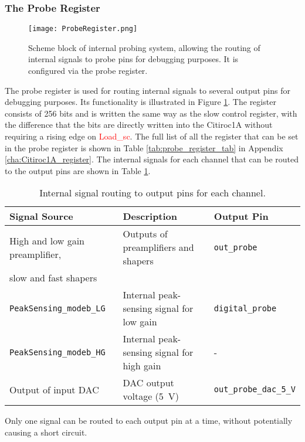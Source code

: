 \subsubsection{The Probe Register}\label{sec:probe_register}
\begin{figure}[H]
    \centering
    \texttt{[image: ProbeRegister.png]}
    \caption{Scheme block of internal probing system, allowing the routing of internal signals to probe pins for debugging purposes. It is configured via the probe register.\autocite{datasheetCITIROC}}
    \label{fig:CITIROC1A_proberegiseter}
\end{figure}
The probe register is used for routing internal signals to several output pins for debugging purposes.
Its functionality is illustrated in Figure \ref{fig:CITIROC1A_proberegiseter}.
The register consists of 256 bits and is written the same way as the slow control register,
 with the difference that the bits are directly written into the Citiroc1A without requiring a rising edge on \textcolor{red}{Load\_sc}.\autocite{datasheetCITIROC}
\newline
 The full list of all the register that can be set in the probe register is shown in Table \ref{tab:probe_register_tab} in Appendix \ref{cha:Citiroc1A_register}.
\newline
The internal signals for each channel that can be routed to the output pins are shown in Table \ref{tab:probe_register}. 
 \begin{table}[H]
    \centering
    \begin{tabular}{@{}lll@{}}
    \toprule
    \textbf{Signal Source} & \textbf{Description}                   & \textbf{Output Pin}        \\ \midrule
    High and low gain preamplifier, & Outputs of preamplifiers and shapers & \texttt{out\_probe}        \\
    slow and fast shapers                                                   &                          \\ \midrule
    \texttt{PeakSensing\_modeb\_LG} & Internal peak-sensing signal for low gain & \texttt{digital\_probe}    \\
    \texttt{PeakSensing\_modeb\_HG} & Internal peak-sensing signal for high gain & -    \\ \midrule
    Output of input DAC            & DAC output voltage (\SI{5}{\volt})  & \texttt{out\_probe\_dac\_5\_V} \\ \bottomrule
    \end{tabular}
    \caption{Internal signal routing to output pins for each channel.}
    \label{tab:probe_register}
\end{table}
Only one signal can be routed to each output pin at a time, without potentially causing a short circuit.\autocite{datasheetCITIROC}
